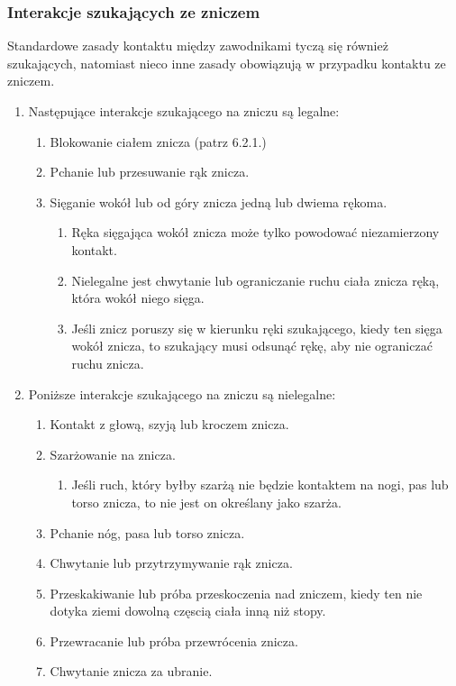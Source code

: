\documentclass[11pt,a4paper]{article}
\begin{document}
\subsubsection{Interakcje szukających ze zniczem}
Standardowe zasady kontaktu między zawodnikami tyczą się również szukających, natomiast nieco inne zasady obowiązują w przypadku kontaktu ze zniczem.
\begin{enumerate}
  \item Następujące interakcje szukającego na zniczu są legalne:
  \begin{enumerate}
    \item Blokowanie ciałem znicza (patrz 6.2.1.) %
    \item Pchanie lub przesuwanie rąk znicza.
    \item Sięganie wokół lub od góry znicza jedną lub dwiema rękoma.
    \begin{enumerate}
      \item Ręka sięgająca wokół znicza może tylko powodować niezamierzony kontakt.
      \item Nielegalne jest chwytanie lub ograniczanie ruchu ciała znicza ręką, która wokół niego sięga.
      \item Jeśli znicz poruszy się w kierunku ręki szukającego, kiedy ten sięga wokół znicza, to szukający musi odsunąć rękę, aby nie ograniczać ruchu znicza.
    \end{enumerate}
  \end{enumerate}
  \item Poniższe interakcje szukającego na zniczu są nielegalne:
  \begin{enumerate}
    \item Kontakt z głową, szyją lub kroczem znicza.
    \item Szarżowanie na znicza.
    \begin{enumerate}
      \item Jeśli ruch, który byłby szarżą nie będzie kontaktem na nogi, pas lub torso znicza, to nie jest on określany jako szarża.
    \end{enumerate}
    \item Pchanie nóg, pasa lub torso znicza.
    \item Chwytanie lub przytrzymywanie rąk znicza.
    \item Przeskakiwanie lub próba przeskoczenia nad zniczem, kiedy ten nie dotyka ziemi dowolną częscią ciała inną niż stopy.
    \item Przewracanie lub próba przewrócenia znicza.
    \item Chwytanie znicza za ubranie.

\end{enumerate}
\end{enumerate}
\end{document}
